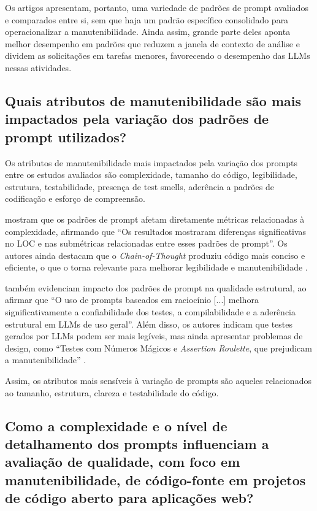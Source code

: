 Os artigos apresentam, portanto, uma variedade de padrões de prompt avaliados e comparados entre si, sem que haja um padrão específico consolidado para operacionalizar a manutenibilidade. Ainda assim, grande parte deles aponta melhor desempenho em padrões que reduzem a janela de contexto de análise e dividem as solicitações em tarefas menores, favorecendo o desempenho das LLMs nessas atividades.

\subsection{Quais atributos de manutenibilidade são mais impactados pela variação dos padrões de prompt utilizados?}

Os atributos de manutenibilidade mais impactados pela variação dos prompts entre os estudos avaliados são complexidade, tamanho do código, legibilidade, estrutura, testabilidade, presença de test smells, aderência a padrões de codificação e esforço de compreensão. 

 mostram que os padrões de prompt afetam diretamente métricas relacionadas à complexidade, afirmando que ``Os resultados mostraram diferenças significativas no LOC e nas submétricas relacionadas entre esses padrões de prompt''. Os autores ainda destacam que o \textit{Chain-of-Thought} produziu código mais conciso e eficiente, o que o torna relevante para melhorar legibilidade e manutenibilidade \cite{DellaPortaEtAll}.

 também evidenciam impacto dos padrões de prompt na qualidade estrutural, ao afirmar que ``O uso de prompts baseados em raciocínio [...] melhora significativamente a confiabilidade dos testes, a compilabilidade e a aderência estrutural em LLMs de uso geral''. Além disso, os autores indicam que testes gerados por LLMs podem ser mais legíveis, mas ainda apresentar problemas de design, como ``Testes com Números Mágicos e \textit{Assertion Roulette}, que prejudicam a manutenibilidade'' \cite[p.~1, tradução nossa]{OuedraogoEtAll}. 

Assim, os atributos mais sensíveis à variação de prompts são aqueles relacionados ao tamanho, estrutura, clareza e testabilidade do código.

\subsection{Como a complexidade e o nível de detalhamento dos prompts influenciam a avaliação de qualidade, com foco em manutenibilidade, de código-fonte em projetos de código aberto para aplicações web?}

